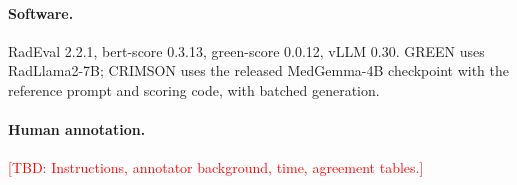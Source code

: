 \documentclass[11pt]{article}
\newcommand{\tbd}[1]{\textcolor{red}{[TBD: #1]}}
\begin{document}
\paragraph{Software.} RadEval 2.2.1, bert-score 0.3.13, green-score 0.0.12, vLLM 0.30. GREEN uses RadLlama2-7B; CRIMSON uses the released MedGemma-4B checkpoint with the reference prompt and scoring code, with batched generation.

\paragraph{Human annotation.} \tbd{Instructions, annotator background, time, agreement tables.}
\end{document}
